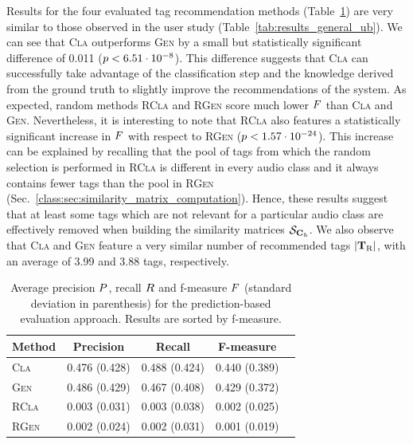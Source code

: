 Results for the four evaluated tag recommendation methods (Table~\ref{tab:results_general_pb}) are very similar to those observed in the user study (Table~\ref{tab:results_general_ub}). We can see that \textsc{Cla} outperforms \textsc{Gen} by a small but statistically significant difference of 0.011 ($p < 6.51\cdot 10^{-8}$). This difference suggests that \textsc{Cla} can successfully take advantage of the classification step and the knowledge derived from the ground truth to slightly improve the recommendations of the system. As expected, random methods \textsc{RCla} and \textsc{RGen} score much lower $F$ than \textsc{Cla} and \textsc{Gen}. Nevertheless, it is interesting to note that \textsc{RCla} also features a statistically significant increase in $F$ with respect to \textsc{RGen} ($p < 1.57\cdot 10^{-24}$). This increase can be explained by recalling that the pool of tags from which the random selection is performed in \textsc{RCla} is different in every audio class and it always contains fewer tags than the pool in \textsc{RGen} (Sec.~\ref{class:sec:similarity_matrix_computation}). Hence, these results suggest that at least some tags which are not relevant for a particular audio class are effectively removed when building the similarity matrices $\mathcal{S}_{\mathbf{C}_{h}}$. We also observe that \textsc{Cla} and \textsc{Gen} feature a very similar number of recommended tags $\vert \mathbf{T}_{\text{R}} \vert$, with an average of 3.99 and 3.88 tags, respectively.

\begin{table}
\begin{center}
\footnotesize
\begin{tabular}{l@{\hskip 1cm}cccc}
\toprule
	  \textbf{Method} & \textbf{Precision} & \textbf{Recall} & \textbf{F-measure} \\ 
	  \midrule
	\textsc{Cla}  & 0.476 (0.428) 		&  0.488 (0.424) 		&  0.440 (0.389) \\ 
	\textsc{Gen}  & 0.486 (0.429) 		&  0.467 (0.408) 		&  0.429 (0.372) \\ 
	\textsc{RCla} & 0.003 (0.031) 		&  0.003 (0.038) 		&  0.002 (0.025) \\ 
	\textsc{RGen} & 0.002 (0.024) 		&  0.002 (0.031) 		&  0.001 (0.019) \\ 
\bottomrule
\end{tabular}
\end{center}
\caption[Average precision, recall and f-measure per recommendation method]{Average precision $P$, recall $R$ and f-measure $F$ (standard deviation in parenthesis) for the prediction-based evaluation approach. Results are sorted by f-measure.}
\label{tab:results_general_pb}
\end{table}

